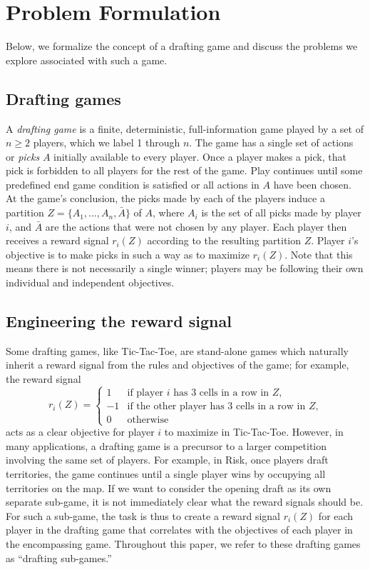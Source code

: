 \documentclass[letterpaper]{article}
\numberwithin{equation}{section}
\numberwithin{theorem}{section}
\numberwithin{lemma}{section}
\numberwithin{df}{section}
\begin{document}
\section{Problem Formulation}
\label{sec:Prob}

Below, we formalize the concept of a drafting game and discuss the problems we explore associated with such a game.

\subsection{Drafting games}
\label{subsec:DraftingGames}

A \emph{drafting game} is a finite, deterministic, full-information game played by a set of $n \geq 2$ players, which we label 1 through $n$.  The game has a single set of actions or \emph{picks} $A$ initially available to every player.  Once a player makes a pick, that pick is forbidden to all players for the rest of the game.  Play continues until some predefined end game condition is satisfied or all actions in $A$ have been chosen.  At the game's conclusion, the picks made by each of the players induce a partition $Z = \{A_1, ..., A_{n}, \bar{A}\}$ of $A$, where $A_i$ is the set of all picks made by player $i$, and $\bar{A}$ are the actions that were not chosen by any player.  Each player then receives a reward signal $r_i(Z)$ according to the resulting partition $Z$.  Player $i$'s objective is to make picks in such a way as to maximize $r_i(Z)$.  Note that this means there is not necessarily a single winner; players may be following their own individual and independent objectives.

\subsection{Engineering the reward signal}

Some drafting games, like Tic-Tac-Toe, are stand-alone games which naturally inherit a reward signal from the rules and objectives of the game; for example, the reward signal
\[ r_i(Z) = \left\{ \begin{array}{cl} 1 & \text{if player $i$ has 3 cells in a row in $Z$,} \\ -1 & \text{if the other player has 3 cells in a row in $Z$,} \\ 0 & \text{otherwise} \end{array} \right. \]
acts as a clear objective for player $i$ to maximize in Tic-Tac-Toe.  However, in many applications, a drafting game is a precursor to a larger competition involving the same set of players.  For example, in Risk, once players draft territories, the game continues until a single player wins by occupying all territories on the map.  If we want to consider the opening draft as its own separate sub-game, it is not immediately clear what the reward signals should be.  For such a sub-game, the task is thus to create a reward signal $r_i(Z)$ for each player in the drafting game that correlates with the objectives of each player in the encompassing game.  Throughout this paper, we refer to these drafting games as ``drafting sub-games.''
\end{document}
